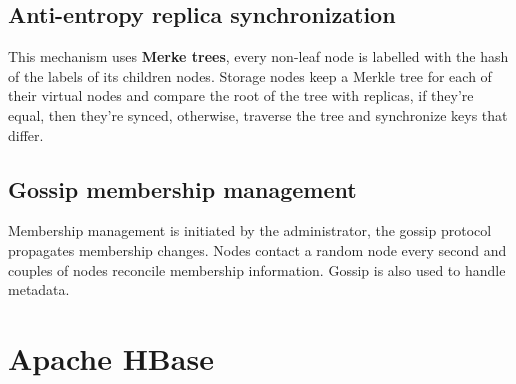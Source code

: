	\subsection{Anti-entropy replica synchronization}
	This mechanism uses \textbf{Merke trees}, every non-leaf node is labelled with the hash of the labels of its children nodes.\newline
	Storage nodes keep a Merkle tree for each of their virtual nodes and compare the root of the tree with replicas, if they're equal, then they're synced, otherwise, traverse the tree and synchronize keys that differ.
	\subsection{Gossip membership management}
	Membership management is initiated by the administrator, the gossip protocol propagates membership changes.\newline
	Nodes contact a random node every second and couples of nodes reconcile membership information.\newline
	Gossip is also used to handle metadata.

\section{Apache HBase}
